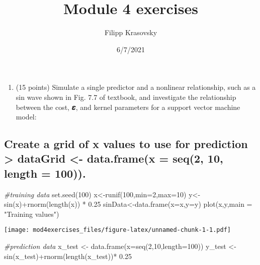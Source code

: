 \documentclass[
]{article}
\title{Module 4 exercises}
\author{Filipp Krasovsky}
\date{6/7/2021}
\newenvironment{Shaded}{\begin{snugshade}}{\end{snugshade}}
\newcommand{\AttributeTok}[1]{\textcolor[rgb]{0.77,0.63,0.00}{#1}}
\newcommand{\CommentTok}[1]{\textcolor[rgb]{0.56,0.35,0.01}{\textit{#1}}}
\newcommand{\DecValTok}[1]{\textcolor[rgb]{0.00,0.00,0.81}{#1}}
\newcommand{\FloatTok}[1]{\textcolor[rgb]{0.00,0.00,0.81}{#1}}
\newcommand{\FunctionTok}[1]{\textcolor[rgb]{0.00,0.00,0.00}{#1}}
\newcommand{\NormalTok}[1]{#1}
\newcommand{\OtherTok}[1]{\textcolor[rgb]{0.56,0.35,0.01}{#1}}
\newcommand{\SpecialCharTok}[1]{\textcolor[rgb]{0.00,0.00,0.00}{#1}}
\newcommand{\StringTok}[1]{\textcolor[rgb]{0.31,0.60,0.02}{#1}}
\providecommand{\tightlist}{%
  \setlength{\itemsep}{0pt}\setlength{\parskip}{0pt}}
\begin{document}
\maketitle

\begin{enumerate}
\def\labelenumi{\arabic{enumi}.}
\tightlist
\item
  (15 points) Simulate a single predictor and a nonlinear relationship,
  such as a sin wave shown in Fig. 7.7 of textbook, and investigate the
  relationship between the cost, 𝜺, and kernel parameters for a support
  vector machine model:
\end{enumerate}

\hypertarget{create-a-grid-of-x-values-to-use-for-prediction-datagrid---data.framex-seq2-10-length-100.}{%
\subsection{Create a grid of x values to use for prediction
\textgreater{} dataGrid \textless- data.frame(x = seq(2, 10, length =
100)).}\label{create-a-grid-of-x-values-to-use-for-prediction-datagrid---data.framex-seq2-10-length-100.}}

\begin{Shaded}
\begin{Highlighting}[]
\CommentTok{\#training data}
\FunctionTok{set.seed}\NormalTok{(}\DecValTok{100}\NormalTok{)}
\NormalTok{x}\OtherTok{\textless{}{-}}\FunctionTok{runif}\NormalTok{(}\DecValTok{100}\NormalTok{,}\AttributeTok{min=}\DecValTok{2}\NormalTok{,}\AttributeTok{max=}\DecValTok{10}\NormalTok{)}
\NormalTok{y}\OtherTok{\textless{}{-}}\FunctionTok{sin}\NormalTok{(x)}\SpecialCharTok{+}\FunctionTok{rnorm}\NormalTok{(}\FunctionTok{length}\NormalTok{(x)) }\SpecialCharTok{*} \FloatTok{0.25}
\NormalTok{sinData}\OtherTok{\textless{}{-}}\FunctionTok{data.frame}\NormalTok{(}\AttributeTok{x=}\NormalTok{x,}\AttributeTok{y=}\NormalTok{y)}
\FunctionTok{plot}\NormalTok{(x,y,}\AttributeTok{main =} \StringTok{"Training values"}\NormalTok{)}
\end{Highlighting}
\end{Shaded}

\texttt{[image: mod4exercises\_files/figure-latex/unnamed-chunk-1-1.pdf]}

\begin{Shaded}
\begin{Highlighting}[]
\CommentTok{\#prediction data }
\NormalTok{x\_test }\OtherTok{\textless{}{-}} \FunctionTok{data.frame}\NormalTok{(}\AttributeTok{x=}\FunctionTok{seq}\NormalTok{(}\DecValTok{2}\NormalTok{,}\DecValTok{10}\NormalTok{,}\AttributeTok{length=}\DecValTok{100}\NormalTok{))}
\NormalTok{y\_test }\OtherTok{\textless{}{-}} \FunctionTok{sin}\NormalTok{(x\_test)}\SpecialCharTok{+}\FunctionTok{rnorm}\NormalTok{(}\FunctionTok{length}\NormalTok{(x\_test))}\SpecialCharTok{*} \FloatTok{0.25}
\end{Highlighting}
\end{Shaded}
\end{document}
